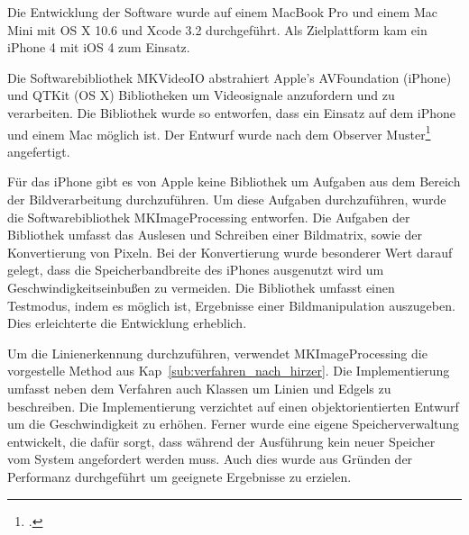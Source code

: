 Die Entwicklung der Software wurde auf einem MacBook Pro und einem Mac Mini mit OS X 10.6 und Xcode 3.2 durchgeführt.
 Als Zielplattform kam ein iPhone 4 mit iOS 4 zum Einsatz.

Die Softwarebibliothek MKVideoIO abstrahiert Apple's AVFoundation (iPhone) und QTKit (OS X) Bibliotheken um
 Videosignale anzufordern und zu verarbeiten. Die Bibliothek wurde so entworfen, dass ein Einsatz auf dem iPhone und
 einem Mac möglich ist. Der Entwurf wurde nach dem Observer Muster\footcite[Vgl.][S.~287--300]{gamma96} angefertigt.

Für das iPhone gibt es von Apple keine Bibliothek um Aufgaben aus dem Bereich der Bildverarbeitung durchzuführen. Um
 diese Aufgaben durchzuführen, wurde die Softwarebibliothek MKImageProcessing entworfen. Die Aufgaben der Bibliothek
 umfasst das Auslesen und Schreiben einer Bildmatrix, sowie der Konvertierung von Pixeln. Bei der Konvertierung wurde
 besonderer Wert darauf gelegt, dass die Speicherbandbreite des iPhones ausgenutzt wird um Geschwindigkeitseinbußen zu
 vermeiden. Die Bibliothek umfasst einen Testmodus, indem es möglich ist, Ergebnisse einer Bildmanipulation auszugeben.
 Dies erleichterte die Entwicklung erheblich.

Um die Linienerkennung durchzuführen, verwendet MKImageProcessing die vorgestelle Method aus
 Kap~\ref{sub:verfahren_nach_hirzer}. Die Implementierung umfasst neben dem Verfahren auch Klassen um Linien und Edgels
 zu beschreiben. Die Implementierung verzichtet auf einen objektorientierten Entwurf um die Geschwindigkeit zu erhöhen.
 Ferner wurde eine eigene Speicherverwaltung entwickelt, die dafür sorgt, dass während der Ausführung kein neuer
 Speicher vom System angefordert werden muss. Auch dies wurde aus Gründen der Performanz durchgeführt um geeignete
 Ergebnisse zu erzielen.

